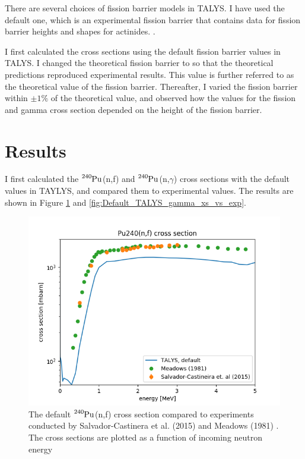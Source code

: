 \documentclass[]{article}
\begin{document}
\noindent There are several choices of fission barrier models in TALYS. I have used the default one, which is an experimental fission barrier that contains data for fission barrier heights and shapes for actinides. \cite{TALYSmanual}. 

\par 
\vspace{3mm}


\noindent I first calculated the cross sections using the default fission barrier values in TALYS. I changed the theoretical fission barrier to so that the theoretical predictions reproduced experimental results. This value is further referred to as the theoretical value of the fission barrier. Thereafter, I varied the fission barrier within $\pm 1 \%$ of the theoretical value, and observed how the values for the fission and gamma cross section depended on the height of the fission barrier.

\section{Results}

\noindent I first calculated the  $\ce{^{240}Pu}$(n,f) and $\ce{^{240}Pu}$(n,$\gamma$) cross sections with the default values in TAYLYS, and compared them to experimental values. The results are shown in Figure \ref{fig:Default_TALYS_fission_xs_to_exp} and \ref{fig:Default_TALYS_gamma_xs_vs_exp}. 

  \begin{figure} [H]
	\centering
	\includegraphics[scale=0.7]{Default_TALYS_fission_xs_to_exp.png}
	\caption{The default $\ce{^{240}Pu}$(n,f) cross section compared to experiments conducted by Salvador-Castinera et al. (2015) \cite{SALVADORCASTINEIRA2015177} and Meadows (1981) \cite{Meadows198}. The cross sections are plotted as a function of incoming neutron energy }
	\label{fig:Default_TALYS_fission_xs_to_exp}
\end{figure}
\end{document}
